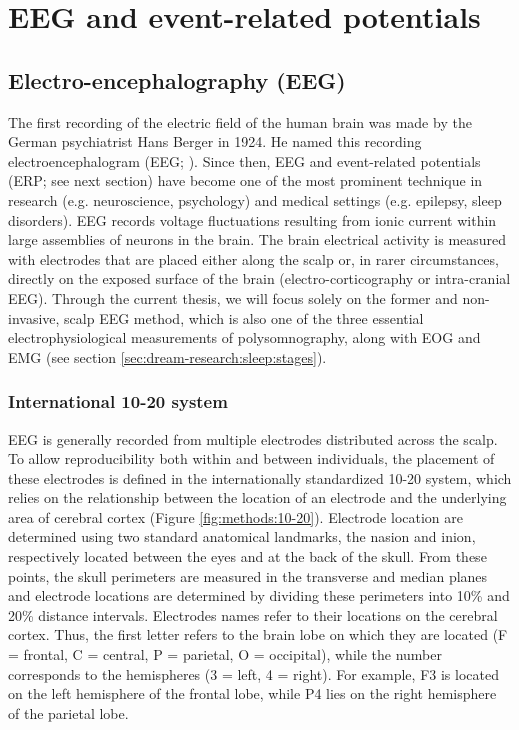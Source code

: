 %
\chapter{EEG and event-related potentials}
\label{sec:eeg}

\section{Electro-encephalography (EEG)}
\label{sec:eeg:eeg}

The first recording of the electric field of the human brain was made by the German psychiatrist Hans Berger in 1924. He named this recording electroencephalogram (EEG; \citealp{berger_uber_1929}). Since then, EEG and event-related potentials (ERP; see next section) have become one of the most prominent technique in research (e.g. neuroscience, psychology) and medical settings (e.g. epilepsy, sleep disorders). EEG records voltage fluctuations resulting from ionic current within large assemblies of neurons in the brain. The brain electrical activity is measured with electrodes that are placed either along the scalp or, in rarer circumstances, directly on the exposed surface of the brain (electro-corticography or intra-cranial EEG). Through the current thesis, we will focus solely on the former and non-invasive, scalp EEG method, which is also one of the three essential electrophysiological measurements of polysomnography, along with EOG and EMG (see section \ref{sec:dream-research:sleep:stages}).

\subsection{International 10-20 system}
\label{sec:eeg:eeg:10-20}

EEG is generally recorded from multiple electrodes distributed across the scalp. To allow reproducibility both within and between individuals, the placement of these electrodes is defined in the internationally standardized 10-20 system, which relies on the relationship between the location of an electrode and the underlying area of cerebral cortex (Figure \ref{fig:methods:10-20}). Electrode location are determined using two standard anatomical landmarks, the nasion and inion, respectively located between the eyes and at the back of the skull. From these points, the skull perimeters are measured in the transverse and median planes and electrode locations are determined by dividing these perimeters into 10\% and 20\% distance intervals. Electrodes names refer to their locations on the cerebral cortex. Thus, the first letter refers to the brain lobe on which they are located (F = frontal, C = central, P = parietal, O = occipital), while the number corresponds to the hemispheres (3 = left, 4 = right). For example, F3 is located on the left hemisphere of the frontal lobe, while P4 lies on the right hemisphere of the parietal lobe.

